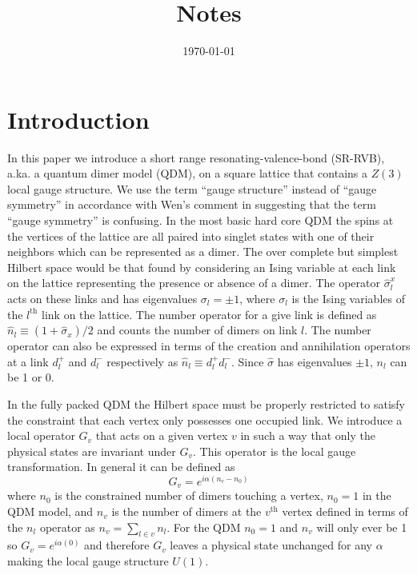 \documentclass[aps,floatfix,11pt]{revtex4-1}
\begin{document}
\title{Notes}

\date{\today}

\begin{abstract}
    
\end{abstract}

\maketitle 

\section{Introduction}
In this paper we introduce a short range resonating-valence-bond (SR-RVB), a.ka. a quantum dimer
model (QDM), on a square lattice that contains a $Z(3)$ local gauge structure. We use the term ``gauge
structure'' instead of ``gauge symmetry'' in accordance with Wen's comment in \cite{wen} suggesting
that the term ``gauge symmetry'' is confusing.  In the most basic hard core QDM the spins at the
vertices of the lattice are all paired into singlet states with one of their neighbors which can be
represented as a dimer. The over complete but simplest Hilbert space would be
that found by considering an Ising variable at each link on the lattice representing the presence or absence of a
dimer.  The operator $\hat{\sigma}^x_l$ acts on these links and has 
eigenvalues $\sigma_l = \pm 1$, where $\sigma_l$ is the
Ising variables of the $l^{\mathrm{th}}$ link on the lattice. The number operator for a give link is
defined as $\hat{n}_l \equiv (1+\hat{\sigma}_x)/2$ and counts the number of dimers on link $l$. The
number operator
can also be expressed in terms of the creation and annihilation operators at a link $d_l^+$ and
$d_l^-$ respectively as $\hat{n}_l \equiv d_l^+ d_l^-$. Since
$\hat{\sigma}$ has eigenvalues $\pm 1$, $n_l$ can be 1 or 0.  

In the fully packed QDM the Hilbert space must be properly restricted to satisfy the constraint that each vertex only
possesses one occupied link. We introduce a local operator $G_v$ that acts on a given vertex $v$ in such a
way that only the physical states are invariant under $G_v$. This operator is the local gauge
transformation. In general it can be defined as
%
\begin{equation}
    \label{}
    G_v=e^{i \alpha (n_v - n_0)}
\end{equation}
%
where $n_0$ is the constrained number of dimers touching a vertex, $n_0=1$ in the QDM model, and
$n_v$ is the number of dimers at the $v^{\mathrm{th}}$ vertex defined in terms of the $n_l$ operator
as $n_v = \sum_{l\in v} n_l$. For the QDM $n_0 = 1$ and $n_v$ will only ever be 1 so $G_v =
e^{i\alpha (0)}$ and therefore $G_v$ leaves a physical state unchanged for any
$\alpha$ making the local gauge structure $U(1)$. 
\end{document}
